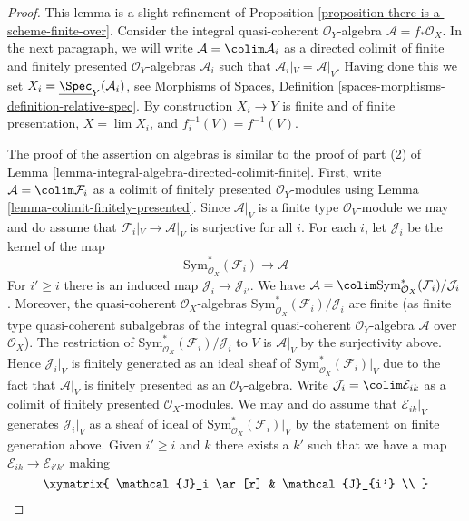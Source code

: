 \begin{proof}
This lemma is a slight refinement of Proposition
\ref{proposition-there-is-a-scheme-finite-over}.
Consider the integral quasi-coherent $\mathcal{O}_Y$-algebra
$\mathcal{A} = f_*\mathcal{O}_X$. In the next paragraph, we will
write $\mathcal{A} = \colim \mathcal{A}_i$ as a directed
colimit of finite and finitely presented $\mathcal{O}_Y$-algebras
$\mathcal{A}_i$ such that $\mathcal{A}_i|_V = \mathcal{A}|_V$.
Having done this we set $X_i = \underline{\Spec}_Y(\mathcal{A}_i)$, see
Morphisms of Spaces, Definition
\ref{spaces-morphisms-definition-relative-spec}.
By construction $X_i \to Y$ is finite and of finite presentation,
$X = \lim X_i$, and $f_i^{-1}(V) = f^{-1}(V)$.

\medskip\noindent
The proof of the assertion on algebras is similar to
the proof of part (2) of
Lemma \ref{lemma-integral-algebra-directed-colimit-finite}.
First, write $\mathcal{A} = \colim \mathcal{F}_i$
as a colimit of finitely presented $\mathcal{O}_Y$-modules using
Lemma \ref{lemma-colimit-finitely-presented}.
Since $\mathcal{A}|_V$ is a finite type $\mathcal{O}_V$-module
we may and do assume that $\mathcal{F}_i|_V \to \mathcal{A}|_V$
is surjective for all $i$.
For each $i$, let $\mathcal{J}_i$ be the kernel of the map
$$
\text{Sym}^*_{\mathcal{O}_X}(\mathcal{F}_i) \longrightarrow \mathcal{A}
$$
For $i' \geq i$ there is an induced map $\mathcal{J}_i \to \mathcal{J}_{i'}$.
We have $\mathcal{A} =
\colim \text{Sym}^*_{\mathcal{O}_X}(\mathcal{F}_i)/\mathcal{J}_i$.
Moreover, the quasi-coherent $\mathcal{O}_X$-algebras
$\text{Sym}^*_{\mathcal{O}_X}(\mathcal{F}_i)/\mathcal{J}_i$
are finite (as finite type quasi-coherent subalgebras of the integral
quasi-coherent $\mathcal{O}_Y$-algebra $\mathcal{A}$ over $\mathcal{O}_X$).
The restriction of $\text{Sym}^*_{\mathcal{O}_X}(\mathcal{F}_i)/\mathcal{J}_i$
to $V$ is $\mathcal{A}|_V$ by the surjectivity above.
Hence $\mathcal{J}_i|_V$ is finitely generated as an ideal sheaf of
$\text{Sym}^*_{\mathcal{O}_X}(\mathcal{F}_i)|_V$ due to the
fact that $\mathcal{A}|_V$ is finitely presented as an
$\mathcal{O}_Y$-algebra.
Write $\mathcal{J}_i = \colim \mathcal{E}_{ik}$
as a colimit of finitely presented $\mathcal{O}_X$-modules.
We may and do assume that $\mathcal{E}_{ik}|_V$
generates $\mathcal{J}_i|_V$ as a sheaf of ideal of
$\text{Sym}^*_{\mathcal{O}_X}(\mathcal{F}_i)|_V$ by the
statement on finite generation above.
Given $i' \geq i$ and $k$ there exists a $k'$ such that we
have a map $\mathcal{E}_{ik} \to \mathcal{E}_{i'k'}$
making
$$
\xymatrix{
\mathcal{J}_i \ar[r] & \mathcal{J}_{i'} \\
}$$
\end{proof}
